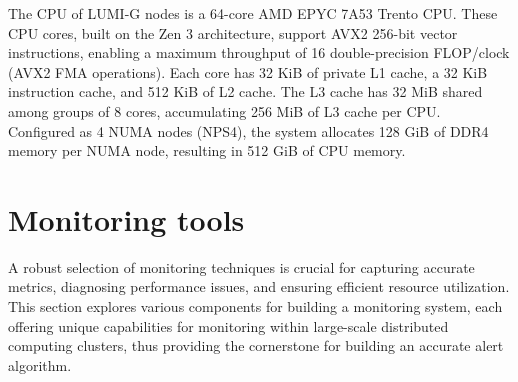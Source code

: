 The CPU of LUMI-G nodes is a 64-core AMD EPYC 7A53 Trento CPU. These CPU cores, built on the Zen 3 architecture, support AVX2 256-bit vector instructions, enabling a maximum throughput of 16 double-precision FLOP/clock (AVX2 FMA operations). Each core has 32 KiB of private L1 cache, a 32 KiB instruction cache, and 512 KiB of L2 cache. The L3 cache has 32 MiB shared among groups of 8 cores, accumulating 256 MiB of L3 cache per CPU. Configured as 4 NUMA nodes (NPS4), the system allocates 128 GiB of DDR4 memory per NUMA node, resulting in 512 GiB of CPU memory.






\section{Monitoring tools}
A robust selection of monitoring techniques is crucial for capturing accurate metrics, diagnosing performance issues, and ensuring efficient resource utilization. This section explores various components for building a monitoring system, each offering unique capabilities for monitoring within large-scale distributed computing clusters, thus providing the cornerstone for building an accurate alert algorithm.

